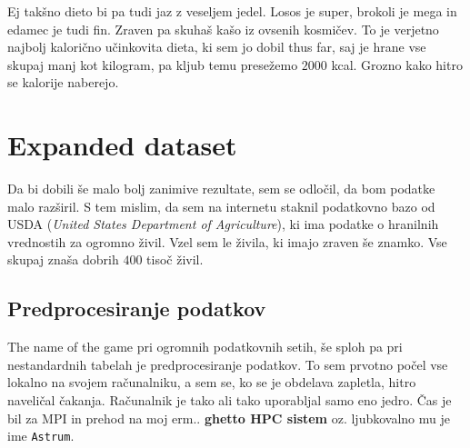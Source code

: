 \documentclass[a4paper]{article}
\begin{document}
Ej takšno dieto bi pa tudi jaz z veseljem jedel. Losos je super, brokoli je mega in edamec 
je tudi fin. Zraven pa skuhaš kašo iz ovsenih kosmičev. To je verjetno najbolj kalorično 
učinkovita dieta, ki sem jo dobil thus far, saj je hrane vse skupaj manj kot kilogram, pa 
kljub temu presežemo $2000$ kcal. Grozno kako hitro se kalorije naberejo. \\

\section{Expanded dataset}
Da bi dobili še malo bolj zanimive rezultate, sem se odločil, da bom podatke malo razširil.
S tem mislim, da sem na internetu staknil podatkovno bazo od USDA (\textit{United States 
Department of Agriculture}), ki ima podatke o hranilnih vrednostih za ogromno živil. Vzel sem 
le živila, ki imajo zraven še znamko. Vse skupaj znaša dobrih $400$ tisoč živil. \\

\subsection{Predprocesiranje podatkov}
The name of the game pri ogromnih podatkovnih setih, še sploh pa pri nestandardnih tabelah je
predprocesiranje podatkov. To sem prvotno počel vse lokalno na svojem računalniku, a sem se, ko 
se je obdelava zapletla, hitro naveličal čakanja. Računalnik je tako ali tako uporabljal samo eno
jedro. Čas je bil za MPI in prehod na moj erm.. \textbf{ghetto HPC sistem} oz. ljubkovalno mu je
ime \texttt{Astrum}. \\
\end{document}
